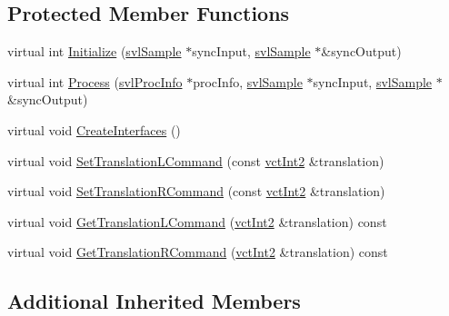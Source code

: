 \subsection*{Protected Member Functions}
\begin{DoxyCompactItemize}
\item 
virtual int \hyperlink{classsvl_filter_image_translation_ac1d4036b6cf799139eafdf40d6d44519}{Initialize} (\hyperlink{classsvl_sample}{svl\-Sample} $\ast$sync\-Input, \hyperlink{classsvl_sample}{svl\-Sample} $\ast$\&sync\-Output)
\item 
virtual int \hyperlink{classsvl_filter_image_translation_ad6db33204e174a7c97155fecb21bf458}{Process} (\hyperlink{structsvl_proc_info}{svl\-Proc\-Info} $\ast$proc\-Info, \hyperlink{classsvl_sample}{svl\-Sample} $\ast$sync\-Input, \hyperlink{classsvl_sample}{svl\-Sample} $\ast$\&sync\-Output)
\item 
virtual void \hyperlink{classsvl_filter_image_translation_abb150819f1baa6186c9cb1c6d051df9f}{Create\-Interfaces} ()
\item 
virtual void \hyperlink{classsvl_filter_image_translation_a9d8cf33e6839cb0c0da9c28b64006b80}{Set\-Translation\-L\-Command} (const \hyperlink{vct_fixed_size_vector_types_8h_add8c88eb6a432b15f14b866b9c35325f}{vct\-Int2} \&translation)
\item 
virtual void \hyperlink{classsvl_filter_image_translation_a2d40a23afdc44babfac98cd5b621d4c8}{Set\-Translation\-R\-Command} (const \hyperlink{vct_fixed_size_vector_types_8h_add8c88eb6a432b15f14b866b9c35325f}{vct\-Int2} \&translation)
\item 
virtual void \hyperlink{classsvl_filter_image_translation_a526bbaf77c15f8dcdce22d9188f26cfd}{Get\-Translation\-L\-Command} (\hyperlink{vct_fixed_size_vector_types_8h_add8c88eb6a432b15f14b866b9c35325f}{vct\-Int2} \&translation) const 
\item 
virtual void \hyperlink{classsvl_filter_image_translation_a0f3d9aca5f8c760ab88f9cecd33f578c}{Get\-Translation\-R\-Command} (\hyperlink{vct_fixed_size_vector_types_8h_add8c88eb6a432b15f14b866b9c35325f}{vct\-Int2} \&translation) const 
\end{DoxyCompactItemize}
\subsection*{Additional Inherited Members}



